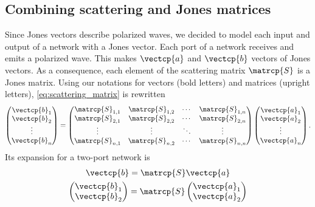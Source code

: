 \begin{refsection}
\subsection{Combining scattering and Jones matrices}
Since Jones vectors describe polarized waves, we decided to model each input and output of a network with a Jones vector.
Each port of a network receives and emits a polarized wave.
This makes $\vectcp{a}$ and $\vectcp{b}$ vectors of Jones vectors.
As a consequence, each element of the scattering matrix $\matrcp{S}$ is a Jones matrix.
Using our notations for vectors (bold letters) and matrices (upright letters), \cref{eq:scattering_matrix} is rewritten
\begin{equation}
        \begin{pmatrix}
            \vectcp{b}_1\\
            \vectcp{b}_2\\
            \vdots\\
            \vectcp{b}_n
        \end{pmatrix}
    =
        \begin{pmatrix}
            \matrcp{S}_{1, 1} & \matrcp{S}_{1, 2} & \cdots & \matrcp{S}_{1, n} \\
            \matrcp{S}_{2, 1} & \matrcp{S}_{2, 2} & \cdots & \matrcp{S}_{2, n} \\
            \vdots   & \vdots   & \ddots & \vdots   \\
            \matrcp{S}_{n, 1} & \matrcp{S}_{n, 2} & \cdots & \matrcp{S}_{n, n}
        \end{pmatrix}
        \begin{pmatrix}
            \vectcp{a}_1\\
            \vectcp{a}_2\\
            \vdots\\
            \vectcp{a}_n
        \end{pmatrix}
    \text{.}
\end{equation}
Its expansion for a two-port network is
\begin{equation}
    \begin{gathered}
    \vectcp{b} = \matrcp{S} \vectcp{a}
    \\
    \begin{pmatrix}
        \vectcp{b}_1 \\ \vectcp{b}_2
    \end{pmatrix}
    =
    \matrcp{S}
    \begin{pmatrix}
        \vectcp{a}_1 \\ \vectcp{a}_2

\end{pmatrix}
\end{gathered}
\end{equation}
\end{refsection}
